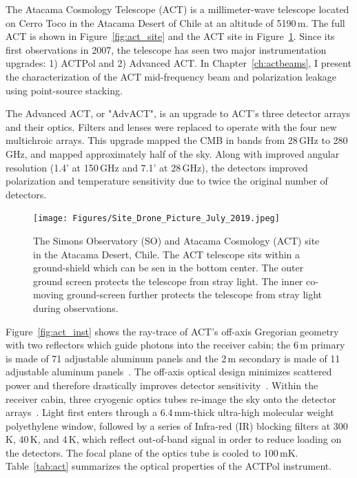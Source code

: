 The Atacama Cosmology Telescope (ACT) is a millimeter-wave telescope located on Cerro Toco in the Atacama Desert of Chile at an altitude of 5190\,m.  The full ACT is shown in Figure~\ref{fig:act_site} and the ACT site in Figure~\ref{fig:act_so_site}.  Since its first observations in 2007, the telescope has seen two major instrumentation upgrades: 1) ACTPol and 2) Advanced ACT.  In Chapter~\ref{ch:actbeams}, I present the characterization of the ACT mid-frequency beam and polarization leakage using point-source stacking.

The Advanced ACT, or "AdvACT", is an upgrade to ACT's three detector arrays and their optics.  Filters and lenses were replaced to operate with the four new multichroic arrays.  This upgrade mapped the CMB in bands from 28\,GHz to 280\,GHz, and mapped approximately half of the sky.  Along with improved angular resolution (1.4' at 150\,GHz and 7.1' at 28\,GHz), the detectors improved polarization and temperature sensitivity due to twice the original number of detectors.
\begin{figure}[t]
    \centering
    \texttt{[image: Figures/Site\_Drone\_Picture\_July\_2019.jpeg]}
    \caption{The Simons Observatory (SO) and Atacama Cosmology (ACT) site in the Atacama Desert, Chile. The ACT telescope sits within a ground-shield which can be sen in the bottom center.  The outer ground screen protects the telescope from stray light.  The inner co-moving ground-screen further protects the telescope from stray light during observations.}
    \label{fig:act_so_site}
\end{figure}

Figure~\ref{fig:act_inst} shows the ray-trace of ACT's off-axis Gregorian geometry with two reflectors which guide photons into the receiver cabin; the 6\,m primary is made of 71 adjustable aluminum panels and the 2\,m secondary is made of 11 adjustable aluminum panels~\cite{act_inst}.  The off-axis optical design minimizes scattered power and therefore drastically improves detector sensitivity~\cite{fowler_2007}.  Within the receiver cabin, three cryogenic optics tubes re-image the sky onto the detector arrays~\cite{thornton_2016}.  Light first enters through a 6.4\,mm-thick ultra-high molecular weight polyethylene window, followed by a series of Infra-red (IR) blocking filters at 300\,K, 40\,K, and 4\,K, which reflect out-of-band signal in order to reduce loading on the detectors.  The focal plane of the optics tube is cooled to 100\,mK.   Table~\ref{tab:act} summarizes the optical properties of the ACTPol instrument.

